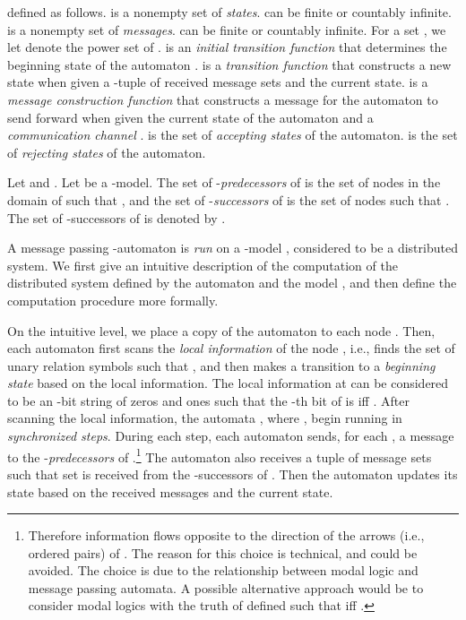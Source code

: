\documentclass[copyright,creativecommons]{eptcs}
\begin{document}
defined as follows.
 is a nonempty set of \emph{states}.  can be finite or countably infinite.
 is a nonempty set of \emph{messages}.
 can be finite or countably infinite.
For a set , we let  denote the power set of .
 is an \emph{initial transition function} that
determines the beginning state of the automaton . 
is a \emph{transition function} that constructs a new state 
when given a -tuple  of received message sets
and the current state.  is a \emph{message construction function}
that constructs a message for the automaton to send forward when given the current state of the automaton and a
\emph{communication channel} .
 is the set of \emph{accepting states} of the automaton.
 is the set of \emph{rejecting states} of the automaton.




Let  and .
Let  be a -model. The set of -\emph{predecessors} of  is the set of
nodes  in the domain of  such that , and the set of -\emph{successors} of  is
the set of nodes  such that . The set of -successors of  is denoted by .




A message passing -automaton  
is \emph{run} on a -model ,
considered to be a distributed system. We first give an intuitive
description of the computation of the distributed system defined by
the automaton  and the model , and then define the computation
procedure more formally.




On the intuitive level, we place a copy  of the automaton  to each node .
Then, each automaton   first scans the \emph{local  information} of the node , i.e.,
finds the set of unary relation symbols  such that , and then makes a transition to
a \emph{beginning state} based on the local information.
The local information at  can be considered to be an -bit string  of zeros and ones such
that the -th bit of  is  iff .
After scanning the local information, the automata , where ,
begin running in \emph{synchronized steps}. During
each step, each automaton  sends, for each , a message  to the
-\emph{predecessors} of .\hspace{0.4mm}\footnote{Therefore information flows opposite to the direction of
the arrows (i.e., ordered pairs) of . The reason for this choice is technical, and could be avoided.
The choice is due to the relationship between modal logic and message passing automata.
A possible alternative approach would be to consider modal logics with the truth of 
defined such that 
iff .}
The automaton  also receives a tuple  of message sets  such that
set  is received from 
the -successors of . Then the automaton updates its state based on the received messages and
the current state.
\end{document}

